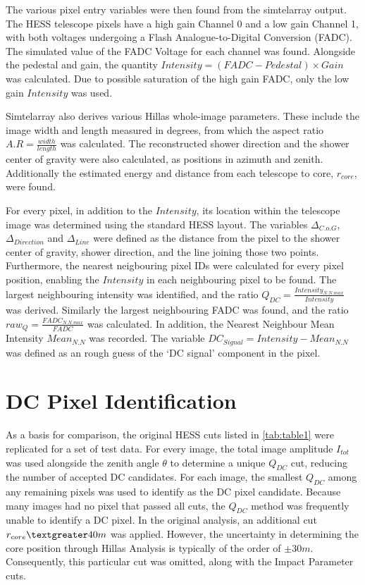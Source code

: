 \documentclass[]{article}
\begin{document}
The various pixel entry variables were then found from the sim\textunderscore telarray output. The HESS telescope pixels have a high gain Channel 0 and a low gain Channel 1, with both voltages undergoing a Flash Analogue-to-Digital Conversion (FADC). The simulated value of the FADC Voltage for each channel was found. Alongside the pedestal and gain, the quantity $Intensity = (FADC - Pedestal)\times Gain $ was calculated. Due to possible saturation of the high gain FADC, only the low gain $Intensity$ was used.

Sim\textunderscore telarray also derives various Hillas whole-image parameters. These include the image width and length measured in degrees, from which the aspect ratio $A.R = \frac{width}{length}$ was calculated. The reconstructed shower direction and the shower center of gravity were also calculated, as positions in azimuth and zenith. Additionally the estimated energy and distance from each telescope to core, $r_{core}$,  were found.

For every pixel, in addition to the $Intensity$, its location within the telescope image was determined using the standard HESS layout. The variables $ \Delta_{C.o.G}$, $\Delta_{Direction}$ and $\Delta_{Line}$ were defined as the distance from the pixel to the shower center of gravity, shower direction, and the line joining those two points. Furthermore, the nearest neigbouring pixel IDs were calculated for every pixel position, enabling the $Intensity$ in each neighbouring pixel to be found. The largest neighbouring intensity was identified, and the ratio $Q_{DC} = \frac{Intensity_{N.N.max}}{Intensity}$ was derived. Similarly the largest neighbouring FADC was found, and the ratio $raw_{Q} = \frac{FADC_{N.N.max}}{FADC}$ was calculated. In addition, the Nearest Neighbour Mean Intensity $Mean_{N.N}$ was recorded. The variable $DC_{Signal} = Intensity-Mean_{N.N}$ was defined as an rough guess of the \textquoteleft DC signal' component in the pixel.

\section{DC Pixel Identification}  
As a basis for comparison, the original HESS cuts listed in \ref{tab:table1} were replicated for a set of test data.   For every image, the total image amplitude $I_{tot}$ was used alongside the zenith angle $\theta$ to determine a unique $Q_{DC}$ cut, reducing the number of accepted DC candidates. For each image, the smallest $Q_{DC}$ among any remaining pixels was used to identify as the DC pixel candidate. Because many images had no pixel that passed all cuts, the $Q_{DC}$ method was frequently unable to identify a DC pixel. In the original analysis, an additional cut $r_{core} \textgreater 40m$ was applied. However, the uncertainty in determining the core position through Hillas Analysis is typically of the order of $\pm 30m$. Consequently, this particular cut was omitted, along with the Impact Parameter cuts. 
\end{document}
